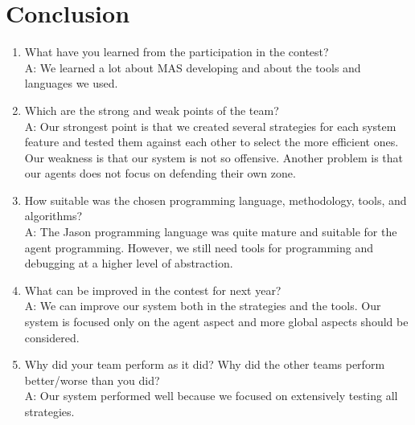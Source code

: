 \section{Conclusion}
\begin{enumerate}
	\item  What have you learned from the participation in the contest?\\
	A: We learned a lot about MAS developing and about the tools and languages we used. %
		
	\item  Which are the strong and weak points of the team?\\
	A: Our strongest point is that we created several strategies for each system feature and  tested them against each other to select the more efficient ones. Our weakness is that our system is not so offensive. Another problem is that our agents does not focus on defending their own zone.%
		
	\item  How suitable was the chosen programming language, methodology, tools, and algorithms?\\
	A: The Jason programming language was quite mature and suitable for the agent programming. However, we still need tools for programming and debugging at a higher level of abstraction.%

	\item  What can be improved in the contest for next year?\\
	A: We can improve our system both in the strategies and the tools. Our system is focused only on the agent aspect and more global aspects should be considered.%
	
	\item  Why did your team perform as it did? Why did the other teams perform better/worse than you did?\\
	A: Our system performed well because we focused on extensively testing all strategies. %
	

\end{enumerate}
